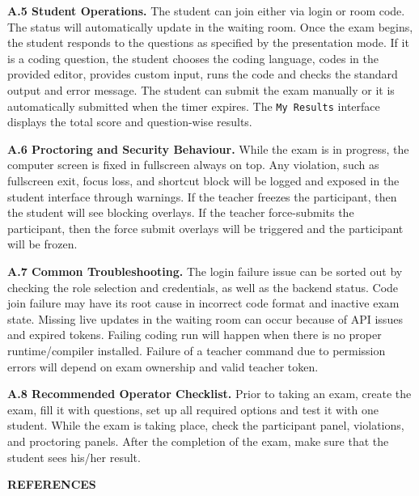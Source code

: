 \documentclass[12pt, a4paper]{report}
\begin{document}
\begin{justify}
{    \textbf{A.5 Student Operations.} The student can join either via login or room code. The status will automatically update in the waiting room. Once the exam begins, the student responds to the questions as specified by the presentation mode. If it is a coding question, the student chooses the coding language, codes in the provided editor, provides custom input, runs the code and checks the standard output and error message. The student can submit the exam manually or it is automatically submitted when the timer expires. The \texttt{My Results} interface displays the total score and question-wise results.

    \textbf{A.6 Proctoring and Security Behaviour.} While the exam is in progress, the computer screen is fixed in fullscreen always on top. Any violation, such as fullscreen exit, focus loss, and shortcut block will be logged and exposed in the student interface through warnings. If the teacher freezes the participant, then the student will see blocking overlays. If the teacher force-submits the participant, then the force submit overlays will be triggered and the participant will be frozen.

    \textbf{A.7 Common Troubleshooting.} The login failure issue can be sorted out by checking the role selection and credentials, as well as the backend status. Code join failure may have its root cause in incorrect code format and inactive exam state. Missing live updates in the waiting room can occur because of API issues and expired tokens. Failing coding run will happen when there is no proper runtime/compiler installed. Failure of a teacher command due to permission errors will depend on exam ownership and valid teacher token.

    \textbf{A.8 Recommended Operator Checklist.} Prior to taking an exam, create the exam, fill it with questions, set up all required options and test it with one student. While the exam is taking place, check the participant panel, violations, and proctoring panels. After the completion of the exam, make sure that the student sees his/her result.
  }
\end{justify}

\newpage
{}

\begin{center}
  {\fontsize{14}{21}\bfseries REFERENCES}
\end{center}
\end{document}
